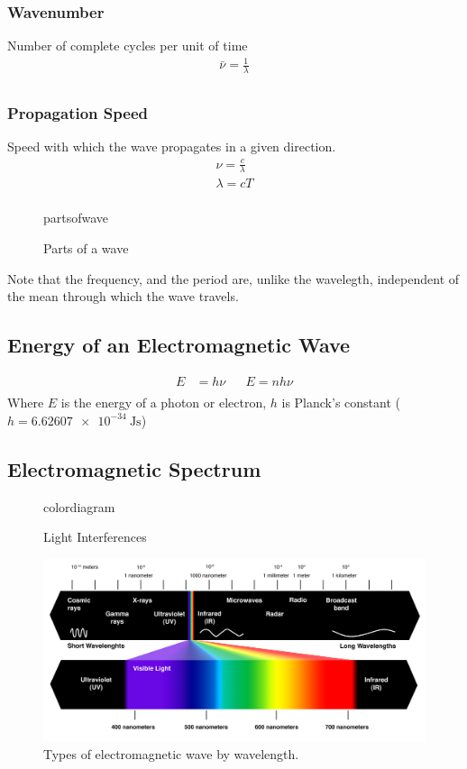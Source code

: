 \documentclass[10pt]{article}
\begin{document}
\subsubsection*{Wavenumber}
Number of complete cycles per unit of time
\begin{align*}
	\bar{\nu} = \frac{1}{\lambda} \\
\end{align*}

\subsubsection*{Propagation Speed}
Speed with which the wave propagates in a given direction.
\begin{align*}
	\nu = \frac{c}{\lambda} \\
	\lambda = cT            \\
\end{align*}
\begin{figure}[H]
	\centering
	{partsofwave}
	\caption{Parts of a wave}\label{fig:partsofwave}
\end{figure}
Note that the frequency, and the period are, unlike the wavelegth, independent
of the mean through which the wave travels.
\clearpage
\subsection{Energy of an Electromagnetic Wave}
\begin{align*}
	E & = h\nu &   & E=nh\nu \\
\end{align*}
Where $E$ is the energy of a photon or electron, $h$ is Planck's constant
($h = \SI{6.62607 e-34}{\joule\second}$)

\subsection{Electromagnetic Spectrum}
\begin{figure}[H]
	\centering
	{colordiagram}
	\caption{Light Interferences}\label{fig:colordiagram}
\end{figure}
\begin{figure}[H]
	\centering
	\includegraphics[scale=0.6]{radiations}
	\caption{Types of electromagnetic wave by wavelength.}\label{fig:radiations}
\end{figure}
\clearpage
\end{document}
